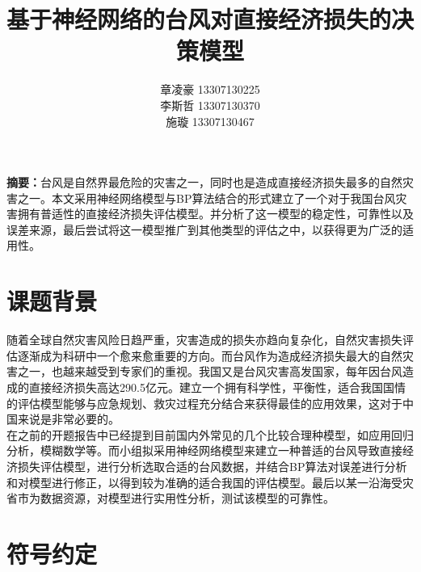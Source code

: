 \documentclass[12pt]{article}
\begin{document}
\pagestyle{fancy}
\lhead{\textbf{{\thetitle}}}
\rhead{\textbf{\nouppercase{\firstleftmark}}}
\cfoot{\thepage}

\title{\textbf{基于神经网络的台风对直接经济损失的决策模型}}
\author{章凌豪 13307130225\\ 李斯哲 13307130370 \\ 施\hspace{12pt}璇 13307130467}
\date{}
\maketitle

{\bf 摘要：}台风是自然界最危险的灾害之一，同时也是造成直接经济损失最多的自然灾害之一。本文采用神经网络模型与BP算法结合的形式建立了一个对于我国台风灾害拥有普适性的直接经济损失评估模型。并分析了这一模型的稳定性，可靠性以及误差来源，最后尝试将这一模型推广到其他类型的评估之中，以获得更为广泛的适用性。

\tableofcontents

\clearpage

\section{课题背景}

随着全球自然灾害风险日趋严重，灾害造成的损失亦趋向复杂化，自然灾害损失评估逐渐成为科研中一个愈来愈重要的方向。而台风作为造成经济损失最大的自然灾害之一，也越来越受到专家们的重视。我国又是台风灾害高发国家，每年因台风造成的直接经济损失高达290.5亿元。建立一个拥有科学性，平衡性，适合我国国情的评估模型能够与应急规划、救灾过程充分结合来获得最佳的应用效果，这对于中国来说是非常必要的。\\
\indent 在之前的开题报告中已经提到目前国内外常见的几个比较合理种模型，如应用回归分析，模糊数学等。而小组拟采用神经网络模型来建立一种普适的台风导致直接经济损失评估模型，进行分析选取合适的台风数据，并结合BP算法对误差进行分析和对模型进行修正，以得到较为准确的适合我国的评估模型。最后以某一沿海受灾省市为数据资源，对模型进行实用性分析，测试该模型的可靠性。

\vspace{20pt}

\section{符号约定}
\end{document}
